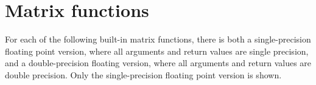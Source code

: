 \hypertarget{group__core__func__matrix}{\section{\-Matrix functions}
\label{group__core__func__matrix}
}
\-For each of the following built-\/in matrix functions, there is both a single-\/precision floating point version, where all arguments and return values are single precision, and a double-\/precision floating version, where all arguments and return values are double precision. \-Only the single-\/precision floating point version is shown. 